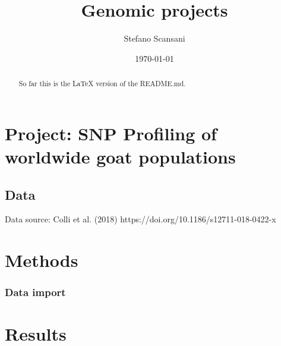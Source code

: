 \documentclass[a4paper,onecolumn,10pt]{article}
\begin{document}
\title{Genomic projects}
\author{Stefano Scansani}
\date{\today}
\maketitle
\begin{abstract}

    So far this is the \LaTeX{} version of the README.md.

\end{abstract}
\tableofcontents
\listoffigures
\listoftables




\section{Project: SNP Profiling of worldwide goat populations}

\subsection{Data}

Data source: Colli et al. (2018)
https://doi.org/10.1186/s12711-018-0422-x

\section{Methods}

\subsubsection{Data import}

\section{Results}




\end{document}
